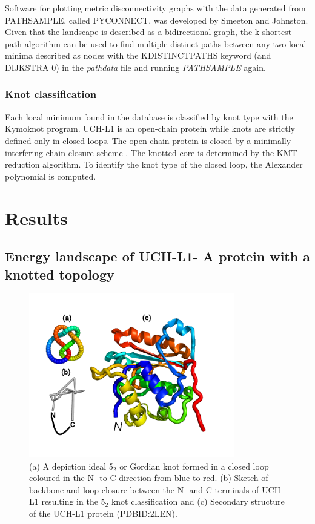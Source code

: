 \documentclass[journal=jacsat]{achemso}
\begin{document}
Software for plotting metric disconnectivity graphs with the data generated from PATHSAMPLE, called PYCONNECT, was developed by Smeeton and Johnston\cite{Smeeton14a}. Given that the landscape is described as a bidirectional graph, the k-shortest path algorithm\cite{Sharpe19a} can be used to find multiple distinct paths between any two local minima described as nodes with the KDISTINCTPATHS keyword (and DIJKSTRA 0) in the \emph{pathdata} file and running \emph{PATHSAMPLE} again. 

\subsubsection{Knot classification}
Each local minimum found in the database is classified by knot type with the Kymoknot program\cite{Tubiana18a}. UCH-L1 is an open-chain protein while knots are strictly defined only in closed loops. The open-chain protein is closed by a minimally interfering chain closure scheme \cite{}. The knotted core is determined by the KMT reduction algorithm\cite{Koniaris91a}. To identify the knot type of the closed loop, the Alexander polynomial is computed. 

\section{Results}
\subsection{Energy landscape of UCH-L1- A protein with a knotted topology}

\begin{figure}
    \centering
    \includegraphics[width=0.8\textwidth]{Fig2.pdf}
    \caption{ (a) A depiction ideal 5$_2$ or Gordian knot formed in a closed loop coloured in the N- to C-direction from blue to red. (b) Sketch of backbone and loop-closure between the N- and C-terminals of UCH-L1 resulting in the 5$_2$ knot classification and (c) Secondary structure of the UCH-L1 protein (PDBID:2LEN). \label{fig:fig1}
 }
\end{figure}
\end{document}
